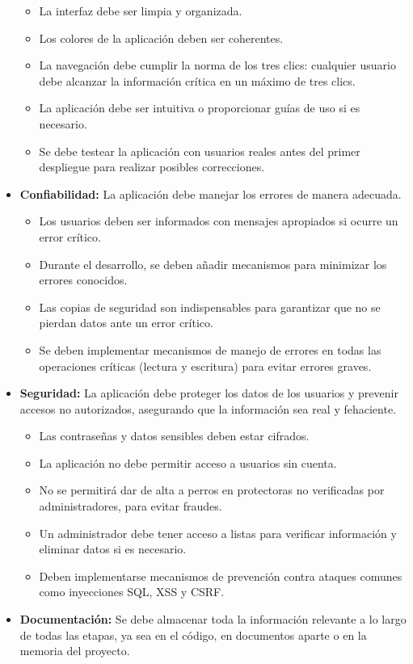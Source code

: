 \documentclass[a4paper, 12pt]{article}
\begin{document}
\begin{itemize}[noitemsep]
\begin{itemize}[noitemsep]
	\item La interfaz debe ser limpia y organizada.
	\item Los colores de la aplicación deben ser coherentes.
	\item La navegación debe cumplir la norma de los tres clics: cualquier usuario debe alcanzar la información crítica en un máximo de tres clics.
	\item La aplicación debe ser intuitiva o proporcionar guías de uso si es necesario.
	\item Se debe testear la aplicación con usuarios reales antes del primer despliegue para realizar posibles correcciones.
	\end{itemize}
\item \textbf{Confiabilidad:} La aplicación debe manejar los errores de manera adecuada.
	\begin{itemize}[noitemsep]
	\item Los usuarios deben ser informados con mensajes apropiados si ocurre un error crítico.
	\item Durante el desarrollo, se deben añadir mecanismos para minimizar los errores conocidos.
	\item Las copias de seguridad son indispensables para garantizar que no se pierdan datos ante un error crítico.
	\item Se deben implementar mecanismos de manejo de errores en todas las operaciones críticas (lectura y escritura) para evitar errores graves.
	\end{itemize}
\item \textbf{Seguridad:} La aplicación debe proteger los datos de los usuarios y prevenir accesos no autorizados, asegurando que la información sea real y fehaciente.
	\begin{itemize}[noitemsep]
	\item Las contraseñas y datos sensibles deben estar cifrados.
	\item La aplicación no debe permitir acceso a usuarios sin cuenta.
	\item No se permitirá dar de alta a perros en protectoras no verificadas por administradores, para evitar fraudes.
	\item Un administrador debe tener acceso a listas para verificar información y eliminar datos si es necesario.
	\item Deben implementarse mecanismos de prevención contra ataques comunes como inyecciones SQL, XSS y CSRF.
	\end{itemize}
\item \textbf{Documentación:} Se debe almacenar toda la información relevante a lo largo de todas las etapas, ya sea en el código, en documentos aparte o en la memoria del proyecto.
\end{itemize}
\end{document}
